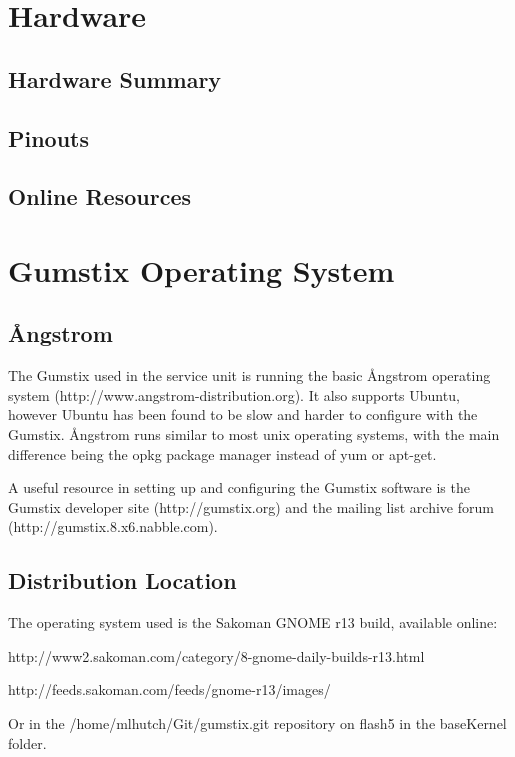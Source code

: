 \section{Hardware}

\subsection{Hardware Summary}

\subsection{Pinouts}

\subsection{Online Resources}

\section{Gumstix Operating System}

\subsection{\r{A}ngstrom}

The Gumstix used in the service unit is running the basic \r{A}ngstrom operating system (http://www.angstrom-distribution.org).
It also supports Ubuntu, however Ubuntu has been found to be slow and harder to configure with the Gumstix.
\r{A}ngstrom runs similar to most unix operating systems, with the main difference being the opkg package manager instead of yum or apt-get.

A useful resource in setting up and configuring the Gumstix software is the Gumstix developer site (http://gumstix.org) and the mailing list archive forum (http://gumstix.8.x6.nabble.com).

\subsection{Distribution Location}
\label{app:gum:distribution}
The operating system used is the Sakoman GNOME r13 build, available online:

http://www2.sakoman.com/category/8-gnome-daily-builds-r13.html

http://feeds.sakoman.com/feeds/gnome-r13/images/

Or in the /home/mlhutch/Git/gumstix.git repository on flash5 in the baseKernel folder.

